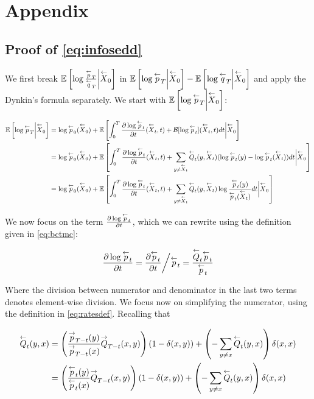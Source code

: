 
\section{Appendix}

\subsection{Proof of \eqref{eq:infosedd}} We first break $\expected\left[\log\frac{\bp_T}{\bq_T}\bigg|\bproc_0\right]$ in $\expected\left[\log\bp_T\bigg|\bproc_0\right]-\expected\left[\log\bq_T\bigg|\bproc_0\right]$ and apply the Dynkin's formula separately. We start with $\expected\left[\log\bp_T\bigg|\bproc_0\right]$:

{\scriptsize\begin{align}
    \expected\left[\log\bp_T\bigg|\bproc_0\right] \nonumber&= \log\bp_0(\bproc_0)+\expected\left[\int_0^T\frac{\partial \log\bp_t}{\partial t}(\bproc_t,t)+\boperator[\log\bp_t](\bproc_t,t)dt\bigg|\bproc_0\right] \\
    & = \log\bp_0(\bproc_0)+\expected\left[\int_0^T\frac{\partial \log\bp_t}{\partial t}(\bproc_t,t)+\sum_{y\neq \bproc_t}\bratesp_t(y,\bproc_t)(\log\bp_t(y)-\log\bp_t(\bproc_t))dt\bigg|\bproc_0\right] \nonumber\\
    & = \log\bp_0(\bproc_0)+\expected\left[\int_0^T\frac{\partial \log\bp_t}{\partial t}(\bproc_t,t)+\sum_{y\neq \bproc_t}\bratesp_t(y,\bproc_t)\log\frac{\bp_t(y)}{\bp_t(\bproc_t)}dt\bigg|\bproc_0\right] \nonumber
\end{align}}

We now focus on the term $\frac{\partial \log\bp_t}{\partial t}$, which we can rewrite using the definition given in \eqref{eq:bctmc}:

\begin{align}
    \frac{\partial \log\bp_t}{\partial t} = \frac{\partial \bp_t}{\partial t}\bigg/ \bp_t = \frac{\bratesp_t\bp_t}{\bp_t}
\end{align}

Where the division between numerator and denominator in the last two terms denotes element-wise division. We focus now on simplifying the numerator, using the definition in \eqref{eq:ratesdef}. Recalling that

\begin{align}\label{eq:ratesdef}
    \bratesp_t(y,x) &= \left(\frac{\fp_{T-t}(y)}{\fp_{T-t}(x)} \fratesp_{T-t}(x,y)\right) (1-\delta(x,y))+\left(-\sum_{y\neq x}\bratesp_t(y,x)\right)\delta(x,x) \\ &= \left(\frac{\bp_{t}(y)}{\bp_{t}(x)} \fratesp_{T-t}(x,y)\right) (1-\delta(x,y))+\left(-\sum_{y\neq x}\bratesp_t(y,x)\right)\delta(x,x)
\end{align}

